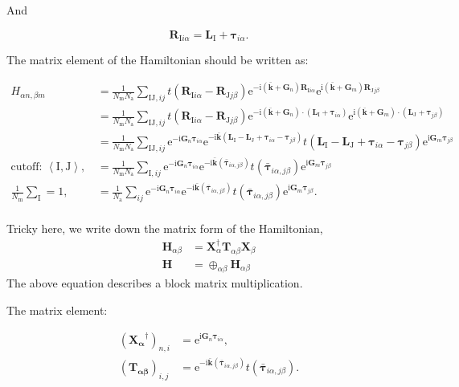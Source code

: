 \documentclass[%
 amsmath,amssymb,
rmp,
]{revtex4-1}
\def \bkbar {\bar{\mathbf{k}}}
\def \bG    {\mathbf{G}}
\def \e     {\mathrm{e}}
\def \I     {\mathrm{I}}
\def \J     {\mathrm{J}}
\def \i     {\mathrm{i}}
\def \bR    {\mathbf{R}}
\def \bL    {\mathbf{L}}
\def \btau  {\bm{\tau}}
\def \bH    {\mathbf{H}}
\begin{document}
And

\begin{equation}
\bR_{\I i \alpha} = \bL_{\I} + \btau_{i \alpha}.
\end{equation}

The matrix element of the Hamiltonian should be written as:

\begin{equation}
\begin{aligned}
H_{\alpha n, \beta m} &= \frac{1}{N_\mathrm{m} N_\mathrm{a}} \sum_{\I \J,ij} t(\bR_{\I i \alpha}-\bR_{\J j \beta})
\e^{-\i(\bkbar+\bG_n)\bR_{\I i \alpha}} \e^{\i(\bkbar+\bG_m)\bR_{\J j \beta}} \\
&= \frac{1}{N_\mathrm{m} N_\mathrm{a}} \sum_{\I \J,ij} t(\bR_{\I i \alpha}-\bR_{\J j \beta})
\e^{-\i(\bkbar+\bG_n)\cdot(\bL_{\I} +\btau_{i\alpha})} \e^{\i(\bkbar+\bG_m)\cdot(\bL_{\J} +\btau_{j\beta})} \\
&=\frac{1}{N_\mathrm{m} N_\mathrm{a}} \sum_{\I \J,ij} \e^{-\i \bG_n \btau_{i\alpha}} \e^{-\i \bkbar (\bL_\I -\bL_\J+\btau_{i\alpha}-\btau_{j\beta})} 
t(\bL_\I -\bL_\J+\btau_{i\alpha}-\btau_{j\beta}) \e^{\i \bG_m \btau_{j\beta}}\\
\text{cutoff: $\left<\I, \J\right>$,}\,\,&= \frac{1}{N_\mathrm{m} N_\mathrm{a}} \sum_{\I ,ij} \e^{-\i \bG_n \btau_{i\alpha}} \e^{-\i \bkbar (\bar{\btau}_{i\alpha, j\beta})} 
t(\bar{\btau}_{i\alpha, j\beta}) \e^{\i \bG_m \btau_{j\beta}} \\
\text{$\frac{1}{N_{\mathrm{m}}}\sum_{\I} =1$,}\,\,&=\frac{1}{N_\mathrm{a}} \sum_{ij} \e^{-\i \bG_n \btau_{i\alpha}} \e^{-\i \bkbar (\bar{\btau}_{i\alpha, j\beta})} 
t(\bar{\btau}_{i\alpha, j\beta}) \e^{\i \bG_m \btau_{j\beta}}. \\
\end{aligned}
\end{equation}

Tricky here, we write down the matrix form of the Hamiltonian,
\begin{equation}
\begin{aligned}
\bH_{\alpha\beta} &= \mathbf{X}^\dagger_{\alpha} \mathbf{T}_{\alpha\beta} \mathbf{X}_{\beta} \\
\bH &= \oplus_{\alpha \beta} \bH_{\alpha\beta}
\end{aligned}
\end{equation}
The above equation describes a block matrix multiplication.

The matrix element:

\begin{equation}
\begin{aligned}
(\mathbf{X_\alpha}^\dagger)_{n,i}  &=\e^{\i\bG_n\btau_{i\alpha}},\\
(\mathbf{T_{\alpha \beta}})_{i, j} &= \e^{-\i \bkbar (\bar{\btau}_{i\alpha, j\beta})} 
t(\bar{\btau}_{i\alpha, j\beta}).
\end{aligned}
\end{equation}
\end{document}
